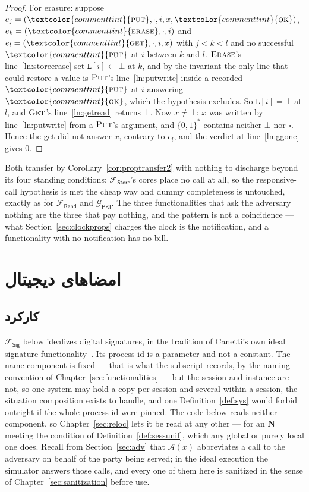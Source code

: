 \documentclass[10pt,oneside,openany]{book}
\newcommand{\admits}{\mathbf{N}}
\newcommand{\Adv}{\mathcal{A}}
\newcommand{\op}[1]{\textnormal{\textsc{#1}}}
\newcommand{\atom}[1]{\textcolor{commenttint}{\op{#1}}}
\newcommand{\ok}{\atom{ok}}
\newcommand{\Frand}{\mathcal{F}_{\mathsf{Rand}}}
\newcommand{\Fstore}{\mathcal{F}_{\mathsf{Store}}}
\newcommand{\Fsig}{\mathcal{F}_{\mathsf{Sig}}}
\newcommand{\Gpki}{\mathcal{G}_{\mathsf{PKI}}}
\newcommand{\unset}{\square}
\newcommand{\none}{\bot}
\newcommand{\V}[1]{\mathtt{#1}}
\newcommand{\bits}{\{0,1\}^*}
\theoremstyle{accentdef}
\theoremstyle{accentplain}
\begin{document}
\begin{proof}
For erasure: suppose $e_j = (\atom{put},\cdot,i,x,\ok)$, $e_k = (\atom{erase},\cdot,i)$ and
$e_l = (\atom{get},\cdot,i,x)$ with $j < k < l$ and no successful $\atom{put}$ at $i$ between $k$ and
$l$. $\op{Erase}$'s line~\ref{ln:storeerase} set $\V{L}[i] \gets \none$ at $k$, and by the
invariant the only
line that could restore a value is $\op{Put}$'s line~\ref{ln:putwrite} inside a recorded
$\atom{put}$ at $i$
answering $\ok$, which the hypothesis excludes. So $\V{L}[i] = \none$ at $l$, and $\op{Get}$'s
line~\ref{ln:getread} returns $\none$. Now $x \neq \none$: $x$ was written by
line~\ref{ln:putwrite} from a $\op{Put}$'s argument, and $\bits$ contains neither $\none$ nor
$\unset$. Hence the get did not answer $x$, contrary to $e_l$, and the verdict at
line~\ref{ln:ggone} gives $0$.
\end{proof}

Both transfer by Corollary~\ref{cor:proptransfer2} with nothing to discharge beyond its four
standing conditions: $\Fstore$'s cores place no call at all, so the responsive-call hypothesis is
met the cheap way and dummy completeness is untouched, exactly as for $\Frand$ and $\Gpki$. The
three functionalities that ask the adversary nothing are the three that pay nothing, and the
pattern is not a coincidence --- what Section~\ref{sec:clockprops} charges the clock is the
notification, and a functionality with no notification has no bill.

\chapter{امضاهای دیجیتال}\label{sec:fsig}

\section{کارکرد}\label{sec:fsigfunc}

$\Fsig$ below idealizes digital signatures, in the tradition of Canetti's own ideal signature
functionality~\cite{Canetti04}. Its process id is a parameter and not a constant. The
name component is fixed --- that is what the subscript records, by the naming convention of
Chapter~\ref{sec:functionalities} --- but the session and instance are not, so one system may hold
a copy per session and several within a session, the situation composition exists to handle, and
one Definition~\ref{def:sys} would forbid outright if the whole process id were pinned. The code
below reads neither component, so Chapter~\ref{sec:reloc} lets it be read at any other --- for an
$\admits$ meeting the condition of Definition~\ref{def:sessunif}, which any global or purely local one
does. Recall
from Section~\ref{sec:adv} that $\Adv(x)$ abbreviates a call to the adversary on behalf of the
party being served; in the ideal execution the simulator answers those calls, and every one of
them here is sanitized in the sense of Chapter~\ref{sec:sanitization} before use.
\end{document}
